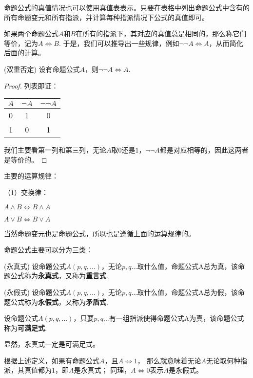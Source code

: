 命题公式的真值情况也可以使用真值表表示。只要在表格中列出命题公式中含有的所有命题变元和所有指派，并计算每种指派情况下公式的真值即可。

如果两个命题公式$A$和$B$在所有的指派下，其对应的真值总是相同的，那么称它们等价，记为$A \Leftrightarrow B$.
于是，我们可以推导出一些规律，例如$\neg \neg A \Leftrightarrow A$，从而简化后面的计算。

\begin{theorem}(双重否定)
    设有命题公式$A$，则$\neg \neg A \Leftrightarrow A$.
\end{theorem}
\begin{proof}
    列表即证：
    \begin{tabular}{c|c|c}
        $A$ & $\neg A$ & $\neg \neg A$ \\
        \hline
        0 & 1 & 0 \\
        1 & 0 & 1 \\
    \end{tabular}

    我们主要看第一列和第三列，无论$A$取$0$还是$1$，$\neg \neg A$都是对应相等的，因此这两者是等价的。
\end{proof}

主要的运算规律：

（1）交换律：

$A \wedge B \Leftrightarrow B \wedge A$

$A \vee B \Leftrightarrow B \vee A$


当然命题变元也是命题公式，所以也是遵循上面的运算规律的。

命题公式主要可以分为三类：
\begin{definition}(永真式)
    设命题公式$A(p,q,...)$，无论$p,q...$取什么值，命题公式A总为真，该命题公式称为\textbf{永真式}，又称为\textbf{重言式}.
\end{definition}
\begin{definition}(永假式)
    设命题公式$A(p,q,...)$，无论$p,q...$取什么值，命题公式A总为假，该命题公式称为\textbf{永假式}，又称为\textbf{矛盾式}.
\end{definition}
\begin{definition}
    设命题公式$A(p,q,...)$，只要$p,q...$有一组指派使得命题公式A为真，该命题公式称为\textbf{可满足式}.
\end{definition}

显然，永真式一定是可满足式。

根据上述定义，如果有命题公式$A$，且$A \Leftrightarrow 1$，
那么就意味着无论$A$无论取何种指派，其真值都为1，即$A$是永真式；
同理，$A \Leftrightarrow 0$表示$A$是永假式。

